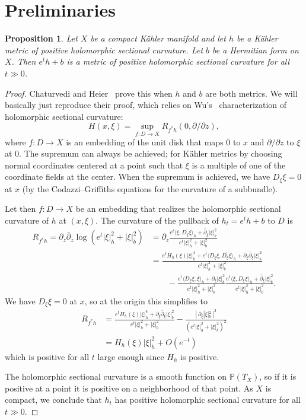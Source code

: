 \documentclass[10pt,a4paper]{amsart}
\newtheorem{prop}[theo]{Proposition}
\newcommand{\kk}[1]{\mathbb{#1}}
\def\<{\langle}
\def\>{\rangle}
\def\ov#1{\overline{#1}}
\def\hsc{holomorphic sectional curvature}
\begin{document}
\section{Preliminaries}

\begin{prop}
\label{prop:positive}
Let $X$ be a compact K\"ahler manifold and let $h$ be a K\"ahler metric of
positive \hsc. Let $b$ be a Hermitian form on $X$.
Then $e^t h + b$ is a metric of positive \hsc{} for all $t \gg 0$.
\end{prop}

\begin{proof}
Chaturvedi and Heier~\cite{chaturvedi2020hermitian} prove this when $h$ and $b$
are both metrics.
We will basically just reproduce their proof, which relies on
Wu's~\cite{wu1973remark} characterization of \hsc:
$$
H(x, \xi) = \sup_{f : D \to X} R_{f^*h}(0, \partial/\partial z),
$$
where $f : D \to X$ is an embedding of the unit disk that maps
$0$ to $x$ and $\partial/\partial z$ to $\xi$ at $0$.
The supremum can always be achieved; for K\"ahler metrics by choosing normal
coordinates centered at a point such that $\xi$ is a multiple of one of the
coordinate fields at the center.
When the supremum is achieved, we have $D_\xi \xi = 0$ at $x$ (by the
Codazzi--Griffiths equations for the curvature of a subbundle).

Let then $f : D \to X$ be an embedding that realizes the \hsc{} of $h$ at
$(x,\xi)$.
The curvature of the pullback of $h_t = e^t h + b$ to $D$ is
\begin{align*}
R_{f^*h}
= \partial_z \bar\partial_z \log(e^t |\xi|^2_h + |\xi|^2_b)
&= \partial_z \frac{e^t \<\xi, \ov{D_\xi\xi}\>_h + \bar\partial_\xi |\xi|^2_b}{e^t |\xi|^2_h + |\xi|^2_b}
\\
&= \frac{e^t H_h(\xi)|\xi|^4_h + e^t \<D_\xi \xi, \ov{D_\xi\xi}\>_h + \partial_\xi\bar\partial_\xi |\xi|^2_b}{e^t |\xi|^2_h + |\xi|^2_b}
\\
&\qquad
- \frac{e^t \<D_\xi \xi, \ov{\xi}\>_h + \partial_\xi |\xi|^2_b}{e^t |\xi|^2_h + |\xi|^2_b}
\frac{e^t \<\xi, \ov{D_\xi\xi}\>_h + \bar\partial_\xi |\xi|^2_b}{e^t |\xi|^2_h + |\xi|^2_b}.
\end{align*}
We have $D_\xi \xi = 0$ at $x$, so at the origin this simplifies to
\begin{align*}
R_{f^*h}
&= \frac{e^t H_h(\xi)|\xi|^4_h + \partial_\xi\bar\partial_\xi |\xi|^2_b}{e^t |\xi|^2_h + |\xi|^2_b}
- \frac{|\, \partial_\xi |\xi|^2_b \,|^2}{(e^t |\xi|^2_h + |\xi|^2_b)^2}
\\
&= H_h(\xi) |\xi|^2_h + O(e^{-t})
\end{align*}
which is positive for all $t$ large enough since $H_h$ is positive.

The \hsc{} is a smooth function on $\kk P(T_X)$, so if it is positive at a
point it is positive on a neighborhood of that point.
As $X$ is compact, we conclude that $h_t$ has positive \hsc{} for all $t \gg 0$.
\end{proof}
\end{document}
